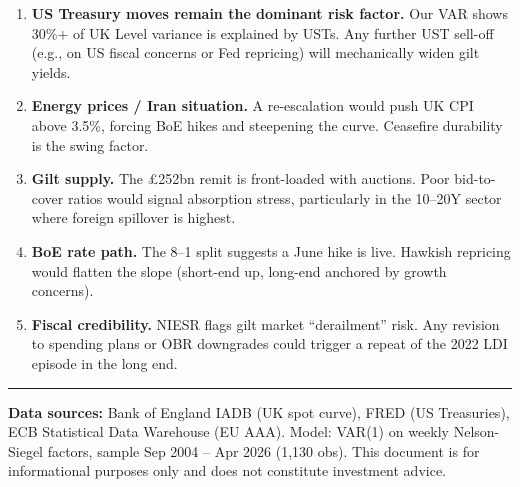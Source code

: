 \documentclass[11pt,a4paper]{article}
\begin{document}
\begin{enumerate}[nosep, leftmargin=1.4em]
    \item \textbf{US Treasury moves remain the dominant risk factor.} Our VAR shows 30\%+ of UK Level variance is explained by USTs. Any further UST sell-off (e.g., on US fiscal concerns or Fed repricing) will mechanically widen gilt yields.
    \item \textbf{Energy prices / Iran situation.} A re-escalation would push UK CPI above 3.5\%, forcing BoE hikes and steepening the curve. Ceasefire durability is the swing factor.
    \item \textbf{Gilt supply.} The \pounds252bn remit is front-loaded with auctions. Poor bid-to-cover ratios would signal absorption stress, particularly in the 10--20Y sector where foreign spillover is highest.
    \item \textbf{BoE rate path.} The 8--1 split suggests a June hike is live. Hawkish repricing would flatten the slope (short-end up, long-end anchored by growth concerns).
    \item \textbf{Fiscal credibility.} NIESR flags gilt market ``derailment'' risk. Any revision to spending plans or OBR downgrades could trigger a repeat of the 2022 LDI episode in the long end.
\end{enumerate}

\vspace{0.3cm}
\noindent\rule{\textwidth}{0.4pt}
{\footnotesize\color{biggrey} \textbf{Data sources:} Bank of England IADB (UK spot curve), FRED (US Treasuries), ECB Statistical Data Warehouse (EU AAA). Model: VAR(1) on weekly Nelson-Siegel factors, sample Sep 2004 -- Apr 2026 (1,130 obs). This document is for informational purposes only and does not constitute investment advice.}
\end{document}
